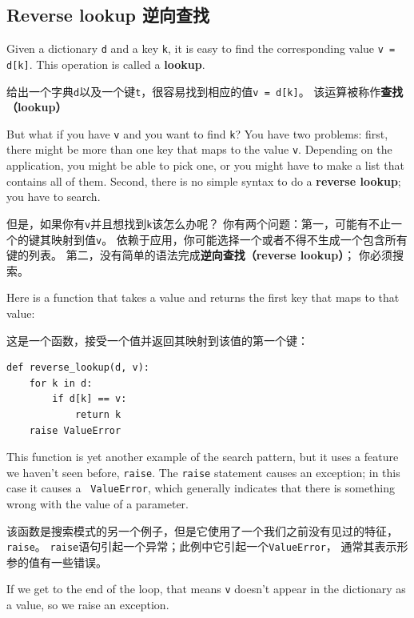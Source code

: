 \documentclass[10pt]{book}
\begin{document}
\begin{CJK}{UTF8}{gbsn}
\section{Reverse lookup 逆向查找}
\label{raise}

Given a dictionary {\tt d} and a key {\tt k}, it is easy to
find the corresponding value {\tt v = d[k]}.  This operation
is called a {\bf lookup}.

给出一个字典{\tt d}以及一个键{\tt t}，很容易找到相应的值{\tt v = d[k]}。
该运算被称作{\bf 查找（lookup）}

But what if you have {\tt v} and you want to find {\tt k}?
You have two problems: first, there might be more than one
key that maps to the value {\tt v}.  Depending on the application,
you might be able to pick one, or you might have to make
a list that contains all of them.  Second, there is no
simple syntax to do a {\bf reverse lookup}; you have to search.

但是，如果你有{\tt v}并且想找到{\tt k}该怎么办呢？
你有两个问题：第一，可能有不止一个的键其映射到值{\tt v}。
依赖于应用，你可能选择一个或者不得不生成一个包含所有键的列表。
第二，没有简单的语法完成{\bf 逆向查找（reverse lookup）}；
你必须搜索。

Here is a function that takes a value and returns the first
key that maps to that value:

这是一个函数，接受一个值并返回其映射到该值的第一个键：

\begin{verbatim}
def reverse_lookup(d, v):
    for k in d:
        if d[k] == v:
            return k
    raise ValueError
\end{verbatim}
%
This function is yet another example of the search pattern, but it
uses a feature we haven't seen before, {\tt raise}.  The {\tt raise}
statement causes an exception; in this case it causes a {\tt
  ValueError}, which generally indicates that there is something wrong
with the value of a parameter.

该函数是搜索模式的另一个例子，但是它使用了一个我们之前没有见过的特征，{\tt raise}。
{\tt raise}语句引起一个异常；此例中它引起一个{\tt ValueError}，
通常其表示形参的值有一些错误。

If we get to the end of the loop, that means {\tt v}
doesn't appear in the dictionary as a value, so we raise an
exception.


\end{CJK}
\end{document}
